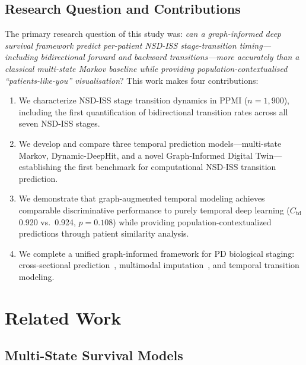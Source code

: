 \subsection{Research Question and Contributions}

The primary research question of this study was: \emph{can a graph-informed deep survival framework predict per-patient NSD-ISS stage-transition timing---including bidirectional forward and backward transitions---more accurately than a classical multi-state Markov baseline while providing population-contextualised ``patients-like-you'' visualisation}? This work makes four contributions:
\begin{enumerate}
    \item We characterize NSD-ISS stage transition dynamics in PPMI ($n{=}1{,}900$), including the first quantification of bidirectional transition rates across all seven NSD-ISS stages.
    \item We develop and compare three temporal prediction models---multi-state Markov, Dynamic-DeepHit, and a novel Graph-Informed Digital Twin---establishing the first benchmark for computational NSD-ISS transition prediction.
    \item We demonstrate that graph-augmented temporal modeling achieves comparable discriminative performance to purely temporal deep learning ($C_\text{td}$ 0.920 vs.\ 0.924, $p{=}0.108$) while providing population-contextualized predictions through patient similarity analysis.
    \item We complete a unified graph-informed framework for PD biological staging: cross-sectional prediction~\cite{paper1}, multimodal imputation~\cite{paper2}, and temporal transition modeling.
\end{enumerate}

\section{Related Work}
\label{p3:sec:related}

\subsection{Multi-State Survival Models}

